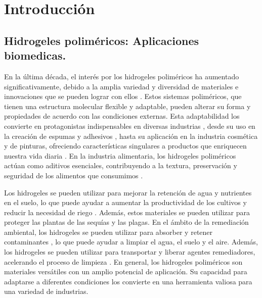 
\chapter{Introducci\'on}
\label{Chapter1} %


\section{Hidrogeles polim\'ericos: Aplicaciones biomedicas.} 

En la \'ultima d\'ecada, el inter\'es por los hidrogeles polim\'ericos ha aumentado significativamente, debido a la amplia variedad y diversidad de materiales e innovaciones que se pueden lograr con ellos .
Estos sistemas polim\'ericos, que tienen una estructura molecular flexible y adaptable, pueden alterar su forma y propiedades de acuerdo con las condiciones externas.
Esta adaptabilidad los convierte en protagonistas indispensables en diversas industrias \cite{zhu2022review}, desde su uso en la creaci\'on de espumas y adhesivos \cite{wu2021review, chowdhury2019novel}, hasta su aplicaci\'on en la industria cosm\'etica y de pinturas, ofreciendo caracter\'isticas singulares a productos que enriquecen nuestra vida diaria \cite{hirst2019fundamentals}.
En la industria alimentaria, los hidrogeles polim\'ericos act\'uan como aditivos esenciales, contribuyendo a la textura, preservaci\'on y seguridad de los alimentos que consumimos \cite{kwok2019microgel}.

Los hidrogeles se pueden utilizar para mejorar la retenci\'on de agua y nutrientes en el suelo, lo que puede ayudar a aumentar la productividad de los cultivos y reducir la necesidad de riego \addcite. Adem\'as, estos materiales se pueden utilizar para proteger las plantas de las sequ\'ias y las plagas.
En el \'ambito de la remediaci\'on ambiental, los hidrogeles se pueden utilizar para absorber y retener contaminantes \addcite, lo que puede ayudar a limpiar el agua, el suelo y el aire. Adem\'as, los hidrogeles se pueden utilizar para transportar y liberar agentes remediadores, acelerando el proceso de limpieza \addcite.
En general, los hidrogeles polim\'ericos son materiales vers\'atiles con un amplio potencial de aplicaci\'on. Su capacidad para adaptarse a diferentes condiciones los convierte en una herramienta valiosa para una variedad de industrias.

